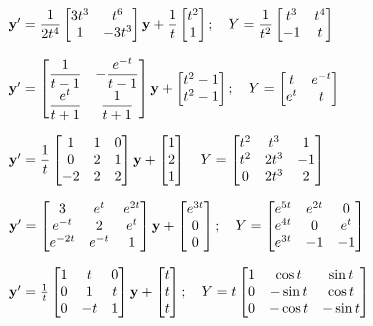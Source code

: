 \begin{exerciselist}
\item\label{exer:10.7.15}$\mathbf{y}'
=\dfrac{1}{2t^4}\begin{bmatrix}3t^3&t^6\\1&-3t^3\end{bmatrix}\mathbf{y}+
\dfrac{1}{t}\begin{bmatrix}t^2\\1\end{bmatrix};  \quad
Y=\dfrac{1}{t^2}\begin{bmatrix}t^3&t^4\\-1&t\end{bmatrix}$

\item\label{exer:10.7.16}$\mathbf{y}'=
\begin{bmatrix}
\dfrac{1}{t-1}&-\dfrac{e^{-t}}{t-1}\\\dfrac{e^t}{t+1}&\dfrac{1}{t+1}
\end{bmatrix}\mathbf{y}
+\begin{bmatrix}t^2-1\\t^2-1\end{bmatrix};  \quad
Y=\begin{bmatrix}t&e^{-t}\\e^t&t\end{bmatrix}$

\item\label{exer:10.7.17}$\mathbf{y}'=\dfrac{1}{t}\begin{bmatrix}1&1&0\\0&2&1\\-2&2&2\end{bmatrix}\mathbf{y}
+\begin{bmatrix}1\\2\\1\end{bmatrix}
\quad Y=\begin{bmatrix}t^2&t^3&1\\t^2&2t^3&-1\\0&2t^3&2\end{bmatrix}$

\item\label{exer:10.7.18}$\mathbf{y}'=
\begin{bmatrix}
3&e^t&e^{2t}\\e^{-t}&2&e^t\\e^{-2t}&e^{-t}&1
\end{bmatrix}\mathbf{y}
+\begin{bmatrix}e^{3t}\\0 \\ 0\end{bmatrix};  \quad
Y=\begin{bmatrix}e^{5t}&e^{2t}&0\\e^{4t}&0&e^t\\e^{3t}&-1&-1\end{bmatrix}$

\item\label{exer:10.7.19}$\mathbf{y}'
=\frac{1}{t}\begin{bmatrix}1&t&0\\0&1&t\\0&-t&1\end{bmatrix}\mathbf{y}
+\begin{bmatrix}t\\t \\t\end{bmatrix};  \quad
Y=t\begin{bmatrix}
1&\cos t&\sin t \\0&-\sin t&\cos t\\0&-\cos t&-\sin t
\end{bmatrix}$


\end{exerciselist}
